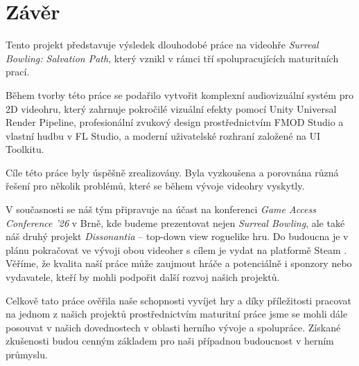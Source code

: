 \chapter*{Závěr}
\label{sec:zaver}

Tento projekt představuje výsledek dlouhodobé práce na videohře \emph{Surreal Bowling: Salvation Path}, který vznikl v rámci tří spolupracujících maturitních prací.

Během tvorby této práce se podařilo vytvořit komplexní audiovizuální systém pro 2D videohru, který zahrnuje pokročilé vizuální efekty pomocí Unity Universal Render Pipeline, profesionální zvukový design prostřednictvím FMOD Studio a vlastní hudbu v FL Studio, a moderní uživatelské rozhraní založené na UI Toolkitu.

Cíle této práce byly úspěšně zrealizovány. Byla vyzkoušena a porovnána různá řešení pro několik problémů, které se během vývoje videohry vyskytly.

V současnosti se náš tým připravuje na účast na konferenci \emph{Game Access Conference '26} v Brně, kde budeme prezentovat nejen \emph{Surreal Bowling}, ale také náš druhý projekt \emph{Dissonantia} -- top-down view roguelike hru. Do budoucna je v plánu pokračovat ve vývoji obou videoher s cílem je vydat na platformě Steam \cite{steam}. Věříme, že kvalita naší práce může zaujmout hráče a potenciálně i sponzory nebo vydavatele, kteří by mohli podpořit další rozvoj našich projektů.

Celkově tato práce ověřila naše schopnosti vyvíjet hry a díky příležitosti pracovat na jednom z našich projektů prostřednictvím maturitní práce jsme se mohli dále posouvat v našich dovednostech v oblasti herního vývoje a spolupráce. Získané zkušenosti budou cenným základem pro naši případnou budoucnost v herním průmyslu.